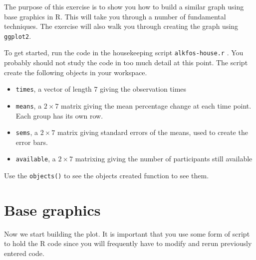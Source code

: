 \documentclass[
]{book}
\providecommand{\tightlist}{%
  \setlength{\itemsep}{0pt}\setlength{\parskip}{0pt}}
\begin{document}
The purpose of this exercise is to show you how to build a similar
graph using base graphics in R. This will take you through a number of
fundamental techniques. The exercise will also walk you through
creating the graph using \texttt{ggplot2}.

To get started, run the code in the housekeeping script
\texttt{alkfos-house.r} . You probably should not study the code in
too much detail at this point. The script create the following
objects in your workspace.

\begin{itemize}
\tightlist
\item
  \texttt{times}, a vector of length 7 giving the observation times
\item
  \texttt{means}, a \(2 \times 7\) matrix giving the mean percentage
  change at each time point. Each group has its own row.
\item
  \texttt{sems}, a \(2 \times 7\) matrix giving standard errors of
  the means, used to create the error bars.
\item
  \texttt{available}, a \(2 \times 7\) matrixing giving the number
  of participants still available
\end{itemize}

Use the \texttt{objects()} to see the objects created function to see
them.

\section{Base graphics}\label{base-graphics}

Now we start building the plot. It is important that you use some form
of script to hold the R code since you will frequently have to modify
and rerun previously entered code.
\end{document}
